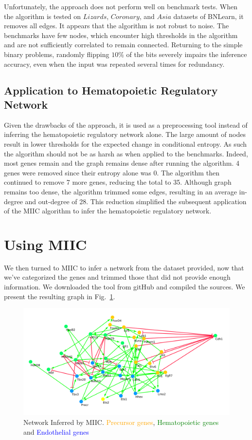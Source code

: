 \documentclass[a4paper,12pt]{book}
\theoremstyle{break}
\begin{document}
 Unfortunately, the approach does not perform well on benchmark tests. When the algorithm is tested on $Lizards$, $Coronary$, and $Asia$ datasets of BNLearn, it removes all edges. It appears that the algorithm is not robust to noise. The benchmarks have few nodes, which encounter high thresholds in the algorithm and are not sufficiently correlated to remain connected. Returning to the simple binary problems, randomly flipping $10\%$ of the bits severely impairs the inference accuracy, even when the input was repeated several times for redundancy. 
 \\
 
 \subsection*{Application to Hematopoietic Regulatory Network}
 Given the drawbacks of the approach, it is used as a preprocessing tool instead of inferring the hematopoietic regulatory network alone. The large amount of nodes result in lower thresholds for the expected change in conditional entropy. As such the algorithm should not be as harsh as when applied to the benchmarks. Indeed, most genes remain and the graph remains dense after running the algorithm. 4 genes were removed since their entropy alone was 0. The algorithm then continued to remove 7 more genes, reducing the total to 35. Although graph remains too dense, the algorithm trimmed some edges, resulting in an average in-degree and out-degree of 28. This reduction simplified the subsequent application of the MIIC algorithm to infer the hematopoietic regulatory network.
 
\section*{Using MIIC}
	We then turned to MIIC to infer a network from the dataset provided, now that we've categorized the genes and trimmed those that did not provide enough information. We downloaded the tool from gitHub and compiled the sources. We present the resulting graph in Fig.~\ref{fig:miicnetwork}.
	\begin{figure}[h!]
		\centering
		\includegraphics[width =\linewidth]{../Datasets/miic-trimmed/miic-trimmed.png}
		\caption{Network Inferred by MIIC. \textcolor{orange}{Precursor genes}, \textcolor{green}{ Hematopoietic genes} and  \textcolor{blue}{Endothelial genes}}
		\label{fig:miicnetwork}
	\end{figure}
\end{document}
